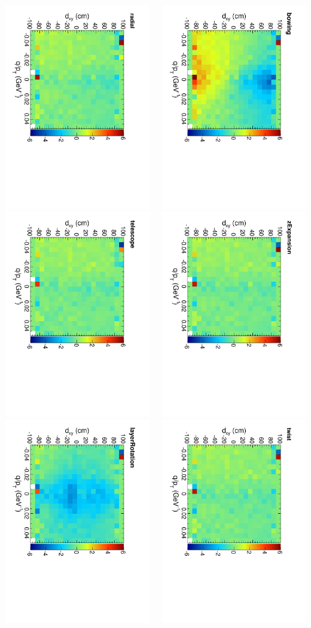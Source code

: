 \documentclass[compress]{beamer}
\begin{document}
\begin{frame}
\begin{columns}
\includegraphics[height=0.32\linewidth, angle=90]{residx-dxy-qoverpt_radial.pdf}
\includegraphics[height=0.32\linewidth, angle=90]{residx-dxy-qoverpt_telescope.pdf}
\includegraphics[height=0.32\linewidth, angle=90]{residx-dxy-qoverpt_layerRotation.pdf}

\includegraphics[height=0.32\linewidth, angle=90]{residx-dxy-qoverpt_bowing.pdf}
\includegraphics[height=0.32\linewidth, angle=90]{residx-dxy-qoverpt_zExpansion.pdf}
\includegraphics[height=0.32\linewidth, angle=90]{residx-dxy-qoverpt_twist.pdf}


\end{columns}
\end{frame}
\end{document}

